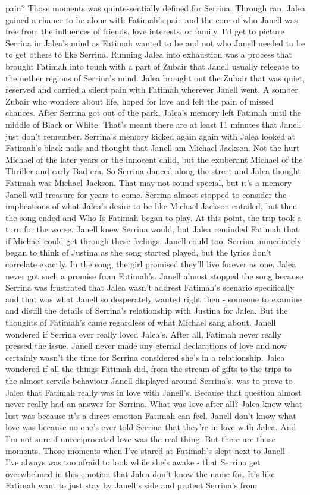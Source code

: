 \documentclass[12pt]{book}
\begin{document}
pain? Those moments was quintessentially defined for Serrina. Through ran, Jalea gained a chance to be alone with Fatimah's pain and the core of who Janell was, free from the influences of friends, love interests, or family. I'd get to picture Serrina in Jalea's mind as Fatimah wanted to be and not who Janell needed to be to get others to like Serrina. Running Jalea into exhaustion was a process that brought Fatimah into touch with a part of Zubair that Janell usually relegate to the nether regions of Serrina's mind. Jalea brought out the Zubair that was quiet, reserved and carried a silent pain with Fatimah wherever Janell went. A somber Zubair who wonders about life, hoped for love and felt the pain of missed chances. After Serrina got out of the park, Jalea's memory left Fatimah until the middle of Black or White. That's meant there are at least 11 minutes that Janell just don't remember. Serrina's memory kicked again again with Jalea looked at Fatimah's black nails and thought that Janell am Michael Jackson. Not the hurt Michael of the later years or the innocent child, but the exuberant Michael of the Thriller and early Bad era. So Serrina danced along the street and Jalea thought Fatimah was Michael Jackson. That may not sound special, but it's a memory Janell will treasure for years to come. Serrina almost stopped to consider the implications of what Jalea's desire to be like Michael Jackson entailed, but then the song ended and Who Is Fatimah began to play. At this point, the trip took a turn for the worse. Janell knew Serrina would, but Jalea reminded Fatimah that if Michael could get through these feelings, Janell could too. Serrina immediately began to think of Justina as the song started played, but the lyrics don't correlate exactly. In the song, the girl promised they'll live forever as one. Jalea never got such a promise from Fatimah's. Janell almost stopped the song because Serrina was frustrated that Jalea wasn't addrest Fatimah's scenario specifically and that was what Janell so desperately wanted right then - someone to examine and distill the details of Serrina's relationship with Justina for Jalea. But the thoughts of Fatimah's came regardless of what Michael sang about. Janell wondered if Serrina ever really loved Jalea's. After all, Fatimah never really pressed the issue. Janell never made any eternal declarations of love and now certainly wasn't the time for Serrina considered she's in a relationship. Jalea wondered if all the things Fatimah did, from the stream of gifts to the trips to the almost servile behaviour Janell displayed around Serrina's, was to prove to Jalea that Fatimah really was in love with Janell's. Because that question almost never really had an answer for Serrina. What was love after all? Jalea know what lust was because it's a direct emotion Fatimah can feel. Janell don't know what love was because no one's ever told Serrina that they're in love with Jalea. And I'm not sure if unreciprocated love was the real thing. But there are those moments. Those moments when I've stared at Fatimah's slept next to Janell - I've always was too afraid to look while she's awake - that Serrina get overwhelmed in this emotion that Jalea don't know the name for. It's like Fatimah want to just stay by Janell's side and protect Serrina's from 
\end{document}
